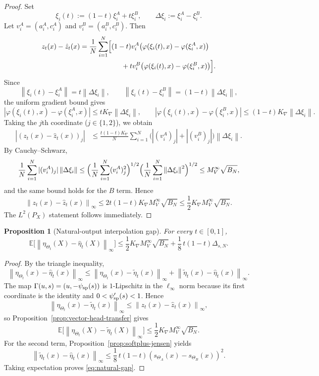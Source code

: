 \documentclass[11pt]{article}
\newtheorem{proposition}[theorem]{Proposition}
\theoremstyle{definition}
\newcommand{\E}{\mathbb{E}}
\newcommand{\norm}[1]{\left\lVert #1 \right\rVert}
\begin{document}
\begin{proof}
Set
\[
  \xi_i(t):=(1-t)\xi_i^A+t\xi_i^B,
  \qquad
  \Delta \xi_i:=\xi_i^A-\xi_i^B.
\]
Let $v_i^A=(a_i^A,c_i^A)$ and $v_i^B=(a_i^B,c_i^B)$. Then
\begin{align*}
  z_t(x)-\hat z_t(x)
  &=
  \frac1N\sum_{i=1}^N
  \Bigl[
    (1-t)v_i^A\bigl(\varphi(\xi_i(t),x)-\varphi(\xi_i^A,x)\bigr)
    \\
  &\qquad\qquad\qquad
    +
    tv_i^B\bigl(\varphi(\xi_i(t),x)-\varphi(\xi_i^B,x)\bigr)
  \Bigr].
\end{align*}
Since
\[
  \norm{\xi_i(t)-\xi_i^A}=t\norm{\Delta\xi_i},
  \qquad
  \norm{\xi_i(t)-\xi_i^B}=(1-t)\norm{\Delta\xi_i},
\]
the uniform gradient bound gives
\[
  |\varphi(\xi_i(t),x)-\varphi(\xi_i^A,x)|
  \le
  tK_{\nabla}\norm{\Delta\xi_i},
  \qquad
  |\varphi(\xi_i(t),x)-\varphi(\xi_i^B,x)|
  \le
  (1-t)K_{\nabla}\norm{\Delta\xi_i}.
\]
Taking the $j$th coordinate ($j\in\{1,2\}$), we obtain
\begin{align*}
  |(z_t(x)-\hat z_t(x))_j|
  &\le
  \frac{t(1-t)K_{\nabla}}{N}
  \sum_{i=1}^N
  \bigl(|(v_i^A)_j|+|(v_i^B)_j|\bigr)\norm{\Delta\xi_i}.
\end{align*}
By Cauchy--Schwarz,
\[
  \frac1N\sum_{i=1}^N |(v_i^A)_j|\norm{\Delta\xi_i}
  \le
  \Bigl(\frac1N\sum_{i=1}^N (v_i^A)_j^2\Bigr)^{1/2}
  \Bigl(\frac1N\sum_{i=1}^N \norm{\Delta\xi_i}^2\Bigr)^{1/2}
  \le
  M_V^\infty \sqrt{B_N},
\]
and the same bound holds for the $B$ term. Hence
\[
  \norm{z_t(x)-\hat z_t(x)}_\infty
  \le
  2t(1-t)K_{\nabla}M_V^\infty\sqrt{B_N}
  \le
  \frac12 K_{\nabla}M_V^\infty\sqrt{B_N}.
\]
The $L^2(P_X)$ statement follows immediately.
\end{proof}

\begin{proposition}[Natural-output interpolation gap]
\label{prop:natural-output-gap}
For every $t\in[0,1]$,
\begin{equation}
  \E\big[\norm{\eta_{\Theta_t}(X)-\hat\eta_t(X)}_\infty\big]
  \le
  \frac12 K_{\nabla} M_V^\infty \sqrt{B_N}
  +
  \frac18\,t(1-t)\Delta_{s,N}.
  \label{eq:natural-gap}
\end{equation}
\end{proposition}

\begin{proof}
By the triangle inequality,
\[
  \norm{\eta_{\Theta_t}(x)-\hat\eta_t(x)}_\infty
  \le
  \norm{\eta_{\Theta_t}(x)-\tilde\eta_t(x)}_\infty
  +
  \norm{\tilde\eta_t(x)-\hat\eta_t(x)}_\infty.
\]
The map $\Gamma(u,s)=(u,-\psi_{\rm sp}(s))$ is $1$-Lipschitz in the
$\ell_\infty$ norm because its first coordinate is the identity and
$0<\psi_{\rm sp}'(s)<1$. Hence
\[
  \norm{\eta_{\Theta_t}(x)-\tilde\eta_t(x)}_\infty
  \le
  \norm{z_t(x)-\hat z_t(x)}_\infty,
\]
so Proposition~\ref{prop:vector-head-transfer} gives
\[
  \E\big[\norm{\eta_{\Theta_t}(X)-\tilde\eta_t(X)}_\infty\big]
  \le
  \frac12 K_{\nabla} M_V^\infty \sqrt{B_N}.
\]
For the second term, Proposition~\ref{prop:softplus-jensen} yields
\[
  \norm{\tilde\eta_t(x)-\hat\eta_t(x)}_\infty
  \le
  \frac18\,t(1-t)(s_{\Theta_A}(x)-s_{\Theta_B}(x))^2.
\]
Taking expectation proves \eqref{eq:natural-gap}.
\end{proof}
\end{document}
